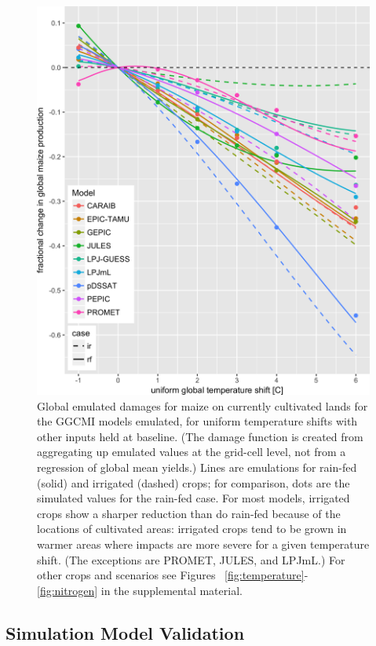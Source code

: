 \documentclass[preprint, 5p, times, twocolumn]{elsarticle}
\begin{document}
\begin{figure}[!htb]
    \centering
    \includegraphics[width=0.95\linewidth]{global_em_maize.png}
    \caption{Global emulated damages for maize on currently cultivated lands for the GGCMI models emulated, for uniform temperature shifts with other inputs held at baseline. (The damage function is created from aggregating up emulated values at the grid-cell level, not from a regression of global mean yields.) Lines are emulations for rain-fed (solid) and irrigated (dashed) crops; for comparison, dots are the simulated values for the rain-fed case.  For most models, irrigated crops show a sharper reduction than do rain-fed because of the locations of cultivated areas: irrigated crops tend to be grown in warmer areas where impacts are more severe for a given temperature shift. (The exceptions are PROMET, JULES, and LPJmL.) For other crops and scenarios see Figures ~\ref{fig:temperature}- \ref{fig:nitrogen} in the supplemental material.}
    \label{fig:globe_em}
\end{figure}

\subsection{Simulation Model Validation}
\end{document}
